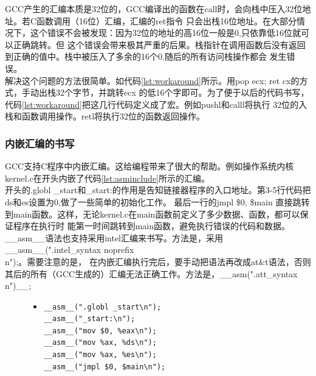 \documentclass[a4paper]{article}
\begin{document}
    GCC产生的汇编本质是32位的，GCC编译出的函数在call时，会向栈中压入32位地址。若C函数调用（16位）汇编，汇编的ret指令
    只会出栈16位地址。在大部分情况下，这个错误不会被发现：因为32位的地址的高16位一般是0,只依靠低16位就可以正确跳转。但
    这个错误会带来极其严重的后果。栈指针在调用函数后没有返回到正确的值中。栈中被压入了多余的16个0.随后的所有访问栈操作都会
    发生错误。\\
    
    解决这个问题的方法很简单。如代码\ref{lst:workaround}所示。用pop ecx; ret cx的方式，手动出栈32个字节，并跳转ecx
    的低16个字即可。为了便于以后的代码书写，代码\ref{lst:workaround}把这几行代码定义成了宏。例如pushl和calll将执行
    32位的入栈和函数调用操作。retl将执行32位的函数返回操作。
    \subsubsection{内嵌汇编的书写}\label{subsec:inlineasm}
    GCC支持C程序中内嵌汇编。这给编程带来了很大的帮助。例如操作系统内核kernel.c在开头内嵌了代码\ref{lst:asminclude}所示的汇编。\\
    
    开头的.globl \_start和\_start:的作用是告知链接器程序的入口地址。第3-5行代码把ds和es设置为0,做了一些简单的初始化工作。
    最后一行的jmpl \$0, \$main 直接跳转到main函数。这样，无论kernel.c在main函数前定义了多少数据、函数，都可以保证程序在执行时
    能第一时间跳转到main函数，避免执行错误的代码和数据。\\
    
    \_\_asm\_\_语法也支持采用intel汇编来书写。方法是，采用\_\_asm\_\_(".intel\_syntax noprefix\\n");。需要注意的是，
    在内嵌汇编执行完后，要手动把语法再改成at\&t语法，否则其后的所有（GCC生成的）汇编无法正确工作。方法是，\_\_asm(".att\_syntax\\n")\_\_;

    \begin{figure}[!hbt]
    \begin{itemize}
    \item[] \begin{lstlisting}[language={[x86masm]Assembler}, label=lst:asminclude, caption=kernel.c文件头包含的内嵌汇编]
__asm__(".globl _start\n");
__asm__("_start:\n");
__asm__("mov $0, %eax\n");
__asm__("mov %ax, %ds\n");
__asm__("mov %ax, %es\n");
__asm__("jmpl $0, $main\n");
    \end{lstlisting}
    \end{itemize}
    \end{figure}
\end{document}
